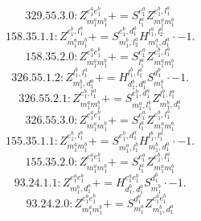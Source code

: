 \documentclass[letterpaper,10pt,fleqn,leqno,onecolumn]{article}
\begin{document}
\begin{equation} \;\;\;\;\;\;  329.55.3.0: Z^{e_{1}^{a}e_{1}^{b}}_{m_{1}^{a}m_{1}^{b}}+=S^{e_{1}^{a}}_{l_{1}^{a}}Z^{e_{1}^{b},l_{1}^{a}}_{m_{1}^{a}m_{1}^{b}} \end{equation}
\begin{equation} \;\;\;\;\;\;  158.35.1.1: Z^{e_{1}^{b},l_{1}^{a}}_{m_{1}^{a}m_{1}^{b}}+=S^{e_{1}^{b},d_{1}^{a}}_{m_{1}^{b},l_{2}^{a}}H^{l_{1}^{a},l_{2}^{a}}_{m_{1}^{a},d_{1}^{a}}\cdot -1. \end{equation}
\begin{equation} \;\;\;\;\;\;  158.35.2.0: Z^{e_{1}^{a}e_{1}^{b}}_{m_{1}^{a}m_{1}^{b}}+=S^{e_{1}^{a}}_{l_{1}^{a}}Z^{e_{1}^{b},l_{1}^{a}}_{m_{1}^{a}m_{1}^{b}} \end{equation}
\begin{equation} \;\;\;\;\;\;  326.55.1.2: Z^{l_{1}^{b},l_{1}^{a}}_{m_{1}^{b},d_{1}^{a}}+=H^{l_{1}^{b},l_{1}^{a}}_{d_{1}^{b},d_{1}^{a}}S^{d_{1}^{b}}_{m_{1}^{b}}\cdot -1. \end{equation}
\begin{equation} \;\;\;\;\;\;  326.55.2.1: Z^{e_{1}^{b},l_{1}^{a}}_{m_{1}^{a}m_{1}^{b}}+=S^{e_{1}^{b},d_{1}^{a}}_{m_{1}^{a},l_{1}^{b}}Z^{l_{1}^{b},l_{1}^{a}}_{m_{1}^{b},d_{1}^{a}} \end{equation}
\begin{equation} \;\;\;\;\;\;  326.55.3.0: Z^{e_{1}^{a}e_{1}^{b}}_{m_{1}^{a}m_{1}^{b}}+=S^{e_{1}^{a}}_{l_{1}^{a}}Z^{e_{1}^{b},l_{1}^{a}}_{m_{1}^{a}m_{1}^{b}} \end{equation}
\begin{equation} \;\;\;\;\;\;  155.35.1.1: Z^{e_{1}^{b},l_{1}^{a}}_{m_{1}^{a}m_{1}^{b}}+=S^{e_{1}^{b},d_{1}^{a}}_{m_{1}^{a},l_{1}^{b}}H^{l_{1}^{b},l_{1}^{a}}_{m_{1}^{b},d_{1}^{a}}\cdot -1. \end{equation}
\begin{equation} \;\;\;\;\;\;  155.35.2.0: Z^{e_{1}^{a}e_{1}^{b}}_{m_{1}^{a}m_{1}^{b}}+=S^{e_{1}^{a}}_{l_{1}^{a}}Z^{e_{1}^{b},l_{1}^{a}}_{m_{1}^{a}m_{1}^{b}} \end{equation}
\begin{equation} \;\;\;\;\;\;  93.24.1.1: Z^{e_{1}^{a}e_{1}^{b}}_{m_{1}^{b},d_{1}^{a}}+=H^{e_{1}^{a}e_{1}^{b}}_{d_{1}^{b},d_{1}^{a}}S^{d_{1}^{b}}_{m_{1}^{b}}\cdot -1. \end{equation}
\begin{equation} \;\;\;\;\;\;  93.24.2.0: Z^{e_{1}^{a}e_{1}^{b}}_{m_{1}^{a}m_{1}^{b}}+=S^{d_{1}^{a}}_{m_{1}^{a}}Z^{e_{1}^{a}e_{1}^{b}}_{m_{1}^{b},d_{1}^{a}} \end{equation}
\end{document}
